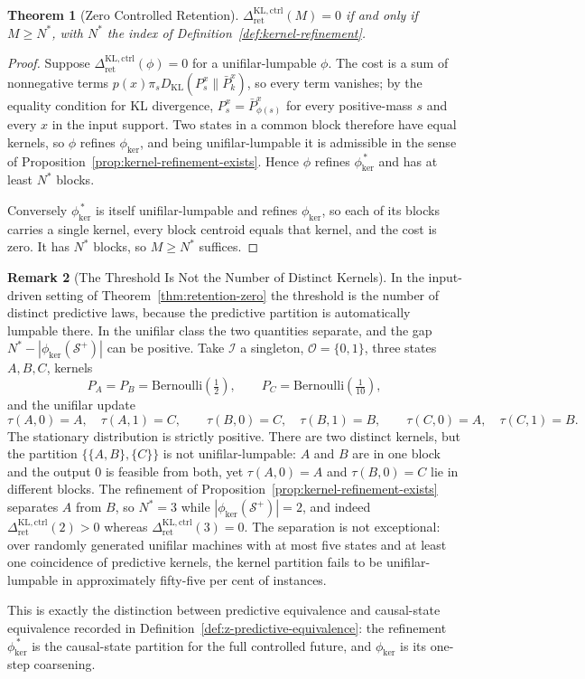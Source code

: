 \documentclass[12pt]{article}
\newtheorem{theorem}{Theorem}[section]
\theoremstyle{definition}
\newtheorem{remark}[theorem]{Remark}
\newcommand{\Splus}{\mathcal S^{+}}
\newcommand{\RetKLc}{\Delta_{\mathrm{ret}}^{\mathrm{KL,ctrl}}}
\begin{document}
\begin{theorem}[Zero Controlled Retention]
\label{thm:controlled-zero}
$\RetKLc(M)=0$ if and only if $M\ge N^{\ast}$, with $N^{\ast}$
the index of Definition~\ref{def:kernel-refinement}.
\end{theorem}

\begin{proof}
Suppose $\RetKLc(\phi)=0$ for a unifilar-lumpable $\phi$.  The
cost is a sum of nonnegative terms $p(x)\pi_sD_{\mathrm{KL}}(P_s^x\|\bar P_k^x)$,
so every term vanishes; by the equality condition for KL divergence,
$P_s^x=\bar P_{\phi(s)}^x$ for every positive-mass $s$ and every $x$ in the
input support.  Two states in a common block therefore have equal kernels, so
$\phi$ refines $\phi_{\ker}$, and being unifilar-lumpable it is admissible in
the sense of Proposition~\ref{prop:kernel-refinement-exists}.  Hence $\phi$
refines $\phi_{\ker}^{\,\ast}$ and has at least $N^{\ast}$ blocks.

Conversely $\phi_{\ker}^{\,\ast}$ is itself unifilar-lumpable and refines
$\phi_{\ker}$, so each of its blocks carries a single kernel, every block
centroid equals that kernel, and the cost is zero.  It has $N^{\ast}$ blocks,
so $M\ge N^{\ast}$ suffices.
\end{proof}

\begin{remark}[The Threshold Is Not the Number of Distinct Kernels]
\label{rem:controlled-zero-not-kernels}
In the input-driven setting of Theorem~\ref{thm:retention-zero} the threshold
is the number of distinct predictive laws, because the predictive partition is
automatically lumpable there.  In the unifilar class the two quantities
separate, and the gap $N^{\ast}-|\phi_{\ker}(\Splus)|$ can be positive.  Take $\mathcal I$ a singleton, $\mathcal O=\{0,1\}$, three states
$A,B,C$, kernels
\[
P_A=P_B=\mathrm{Bernoulli}(\tfrac12),
\qquad
P_C=\mathrm{Bernoulli}(\tfrac1{10}),
\]
and the unifilar update
\[
\tau(A,0)=A,\quad\tau(A,1)=C,\qquad
\tau(B,0)=C,\quad\tau(B,1)=B,\qquad
\tau(C,0)=A,\quad\tau(C,1)=B .
\]
The stationary distribution is strictly positive.  There are two distinct
kernels, but the partition $\{\{A,B\},\{C\}\}$ is not unifilar-lumpable: $A$ and
$B$ are in one block and the output $0$ is feasible from both, yet
$\tau(A,0)=A$ and $\tau(B,0)=C$ lie in different blocks.  The refinement of
Proposition~\ref{prop:kernel-refinement-exists} separates $A$ from $B$, so
$N^{\ast}=3$ while $|\phi_{\ker}(\Splus)|=2$, and indeed
$\RetKLc(2)>0$ whereas $\RetKLc(3)=0$.  The
separation is not exceptional: over randomly generated unifilar machines with
at most five states and at least one coincidence of predictive kernels, the
kernel partition fails to be unifilar-lumpable in approximately fifty-five per
cent of instances.

This is exactly the distinction between predictive equivalence and causal-state
equivalence recorded in Definition~\ref{def:z-predictive-equivalence}: the
refinement $\phi_{\ker}^{\,\ast}$ is the causal-state partition for the full
controlled future, and $\phi_{\ker}$ is its one-step coarsening.
\end{remark}
\end{document}
